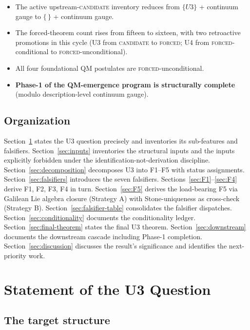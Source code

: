 \documentclass[11pt,a4paper]{article}
\begin{document}
\begin{itemize}
  \item The active upstream-\textsc{candidate} inventory reduces from $\{U3\}$ + continuum gauge to $\{ \, \}$ + continuum gauge.
  \item The forced-theorem count rises from fifteen to sixteen, with two retroactive promotions in this cycle (U3 from \textsc{candidate} to \textsc{forced}; U4 from \textsc{forced}-conditional to \textsc{forced}-unconditional).
  \item All four foundational QM postulates are \textsc{forced}-unconditional.
  \item \textbf{Phase-1 of the QM-emergence program is structurally complete} (modulo description-level continuum gauge).
\end{itemize}

\subsection{Organization}

Section~\ref{sec:question} states the U3 question precisely and inventories its sub-features and falsifiers. Section~\ref{sec:inputs} inventories the structural inputs and the inputs explicitly forbidden under the identification-not-derivation discipline. Section~\ref{sec:decomposition} decomposes U3 into F1--F5 with status assignments. Section~\ref{sec:falsifiers} introduces the seven falsifiers. Sections~\ref{sec:F1}--\ref{sec:F4} derive F1, F2, F3, F4 in turn. Section~\ref{sec:F5} derives the load-bearing F5 via Galilean Lie algebra closure (Strategy A) with Stone-uniqueness as cross-check (Strategy B). Section~\ref{sec:falsifier-table} consolidates the falsifier dispatches. Section~\ref{sec:conditionality} documents the conditionality ledger. Section~\ref{sec:final-theorem} states the final U3 theorem. Section~\ref{sec:downstream} documents the downstream cascade including Phase-1 completion. Section~\ref{sec:discussion} discusses the result's significance and identifies the next-priority work.

\section{Statement of the U3 Question}\label{sec:question}

\subsection{The target structure}
\end{document}
